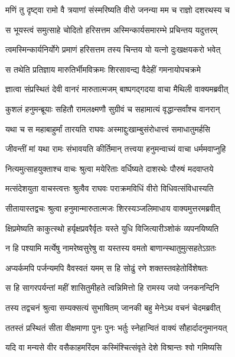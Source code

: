 \twolineshloka
{मणिं तु दृष्ट्वा रामो वै त्रयाणां संस्मरिष्यति}
{वीरो जनन्या मम च राज्ञो दशरथस्य च} %

\twolineshloka
{स भूयस्त्वं समुत्साहे चोदितो हरिसत्तम}
{अस्मिन्कार्यसमारम्भे प्रचिन्तय यदुत्तरम्} %

\twolineshloka
{त्वमस्मिन्कार्यनिर्योगे प्रमाणं हरिसत्तम}
{तस्य चिन्तय यो यत्नो दुःखक्षयकरो भवेत्} %

\twolineshloka
{स तथेति प्रतिज्ञाय मारुतिर्भीमविक्रमः}
{शिरसावन्द्य वैदेहीं गमनायोपचक्रमे} %

\twolineshloka
{ज्ञात्वा संप्रस्थितं देवी वानरं मारुतात्मजम्}
{बाष्पगद्गदया वाचा मैथिली वाक्यमब्रवीत्} %

\twolineshloka
{कुशलं हनुमन्ब्रूयाः सहितौ रामलक्ष्मणौ}
{सुग्रीवं च सहामात्यं वृद्धान्सर्वांश्च वानरान्} %

\twolineshloka
{यथा च स महाबाहुर्मां तारयति राघवः}
{अस्माद्दुःखाम्बुसंरोधात्त्वं समाधातुमर्हसि} %

\twolineshloka
{जीवन्तीं मां यथा रामः संभावयति कीर्तिमान्}
{तत्त्वया हनुमन्वाच्यं वाचा धर्ममवाप्नुहि} %

\twolineshloka
{नित्यमुत्साहयुक्ताश्च वाचः श्रुत्वा मयेरिताः}
{वर्धिष्यते दाशरथेः पौरुषं मदवाप्तये} %

\twolineshloka
{मत्संदेशयुता वाचस्त्वत्तः श्रुत्वैव राघवः}
{पराक्रमविधिं वीरो विधिवत्संविधास्यति} %

\twolineshloka
{सीतायास्तद्वचः श्रुत्वा हनुमान्मारुतात्मजः}
{शिरस्यञ्जलिमाधाय वाक्यमुत्तरमब्रवीत्} %

\twolineshloka
{क्षिप्रमेष्यति काकुत्स्थो हर्यृक्षप्रवरैर्वृतः}
{यस्ते युधि विजित्यारीञ्शोकं व्यपनयिष्यति} %

\twolineshloka
{न हि पश्यामि मर्त्येषु नामरेष्वसुरेषु वा}
{यस्तस्य वमतो बाणान्स्थातुमुत्सहतेऽग्रतः} %

\twolineshloka
{अप्यर्कमपि पर्जन्यमपि वैवस्वतं यमम्}
{स हि सोढुं रणे शक्तस्तवहेतोर्विशेषतः} %

\twolineshloka
{स हि सागरपर्यन्तां महीं शासितुमीहते}
{त्वन्निमित्तो हि रामस्य जयो जनकनन्दिनि} %

\twolineshloka
{तस्य तद्वचनं श्रुत्वा सम्यक्सत्यं सुभाषितम्}
{जानकी बहु मेनेऽथ वचनं चेदमब्रवीत्} %

\twolineshloka
{ततस्तं प्रस्थितं सीता वीक्षमाणा पुनः पुनः}
{भर्तुः स्नेहान्वितं वाक्यं सौहार्दादनुमानयत्} %

\twolineshloka
{यदि वा मन्यसे वीर वसैकाहमरिंदम}
{कस्मिंश्चित्संवृते देशे विश्रान्तः श्वो गमिष्यसि} %

